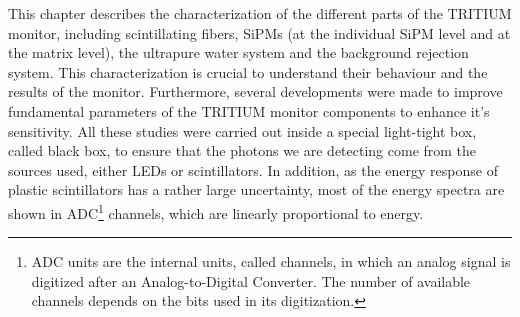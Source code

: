 This chapter describes the characterization of the different parts of the TRITIUM monitor, including scintillating fibers, SiPMs (at the individual SiPM level and at the matrix level), the ultrapure water system and the background rejection system. This characterization is crucial to understand their behaviour and the results of the monitor. Furthermore, several developments were made  to improve fundamental parameters of the TRITIUM monitor components to enhance it's sensitivity. All these studies were carried out inside a special light-tight box, called black box, to ensure that the photons we are detecting come from the sources used, either LEDs or scintillators. In addition, as the energy response of plastic scintillators has a rather large uncertainty, most of the energy spectra are shown in ADC\footnote{ADC units are the internal units, called channels, in which an analog signal is digitized after an Analog-to-Digital Converter. The number of available channels depends on the bits used in its digitization.} channels, which are linearly proportional to energy.